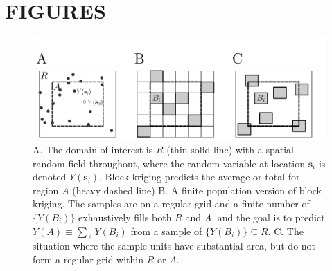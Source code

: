 \documentclass[12pt, titlepage]{article}\usepackage[]{graphicx}\usepackage[]{color}
\begin{document}
\clearpage


\section*{FIGURES}





	\begin{figure}[H]
	\begin{center}
	\includegraphics[width=450pt]{figure/FigRegionsSamples.pdf}
	\end{center}
	\caption{A. The domain of interest is $R$ (thin solid line) with a spatial random field throughout, where the random variable at location $\mathbf{s}_i$ is denoted $Y(\mathbf{s}_i)$.  Block kriging predicts the average or total for region $A$ (heavy dashed line) B. A finite population version of block kriging. The samples are on a regular grid and a finite number of $\{Y(B_i)\}$
	exhaustively fills both $R$ and $A$, and the goal is to predict $Y(A) \equiv
	\sum_AY(B_i)$ from a sample of $\{Y(B_i)\}\subseteq R$.  C. The situation where
	the sample units have substantial area, but do not form a regular grid within
	$R$ or $A$.\label{FigRegionsSamples}}         
	\end{figure}

\end{document}
